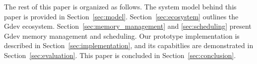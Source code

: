 The rest of this paper is organized as follows.
The system model behind this paper is provided in
Section~\ref{sec:model}.
Section~\ref{sec:ecosystem} outlines the Gdev ecosystem.
Section~\ref{sec:memory_management} and \ref{sec:scheduling} present
Gdev memory management and scheduling.
Our prototype implementation is described in
Section~\ref{sec:implementation}, and its capabitlies are demonstrated
in Section~\ref{sec:evaluation}.
This paper is concluded in Section~\ref{sec:conclusion}.